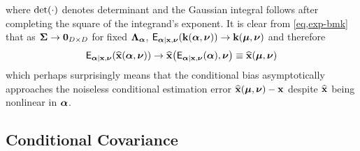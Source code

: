 where $\det\paren{\cdot}$ denotes determinant
and the Gaussian integral follows 
after completing the square
of the integrand's exponent.
It is clear 
from \eqref{eq,exp-bmk}
that as $\boldsymbol{\Sigma} \to \boldsymbol{0}_{D\times D}$
for fixed $\boldsymbol{\Lambda}_{\boldsymbol{\alpha}}$,
$\expect{\bmymag|\bmx,\bmnu}{\bmka{\bmymag,\bmnu}}
	\to \bmka{\bmmu,\bmnu}$
and therefore
\begin{align}
	\expect{\bmymag|\bmx,\bmnu}{\esta{\bmx}{\bmymag,\bmnu}}
		\to \esta{\bmx}{\expect{\bmymag|\bmx,\bmnu}{\bmymag},\bmnu}
		\equiv \esta{\bmx}{\bmmu,\bmnu}
\end{align}
which perhaps surprisingly means that 
the conditional bias asymptotically approaches 
the noiseless conditional estimation error $\esta{\bmx}{\bmmu,\bmnu}-\bmx$
despite $\widehat{\mathbf{x}}$ being nonlinear in $\boldsymbol{\alpha}$.

\subsection{Conditional Covariance}
\label{ss,perk,perf,cov}

